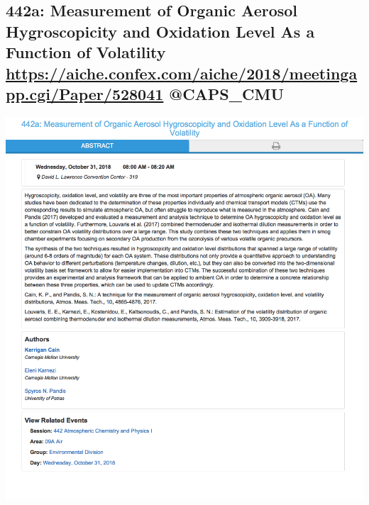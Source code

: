 \documentclass[11pt]{article}
\begin{document}
\subsection{442a: Measurement of Organic Aerosol Hygroscopicity and Oxidation Level As a Function of Volatility \url{https://aiche.confex.com/aiche/2018/meetingapp.cgi/Paper/528041} @CAPS\_CMU}
\label{sec:org2895442}
\begin{center}
\includegraphics[width=.9\linewidth]{./528041.png}
\end{center}
\end{document}
